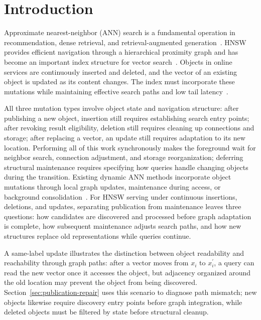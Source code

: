 \documentclass[sigconf,pbalance]{acmart}
\begin{document}

\maketitle



\section{Introduction}
\label{sec:introduction}

Approximate nearest-neighbor (ANN) search is a fundamental operation in recommendation, dense retrieval, and retrieval-augmented generation~\cite{covington2016youtube,karpukhin2020dpr,lewis2020rag}. HNSW provides efficient navigation through a hierarchical proximity graph and has become an important index structure for vector search~\cite{malkov2020hnsw,pan2024vdbsurvey}. Objects in online services are continuously inserted and deleted, and the vector of an existing object is updated as its content changes. The index must incorporate these mutations while maintaining effective search paths and low tail latency~\cite{mohoney2025quake,wang2026candor,dean2013tail}.

All three mutation types involve object state and navigation structure: after publishing a new object, insertion still requires establishing search entry points; after revoking result eligibility, deletion still requires cleaning up connections and storage; after replacing a vector, an update still requires adaptation to its new location. Performing all of this work synchronously makes the foreground wait for neighbor search, connection adjustment, and storage reorganization; deferring structural maintenance requires specifying how queries handle changing objects during the transition. Existing dynamic ANN methods incorporate object mutations through local graph updates, maintenance during access, or background consolidation~\cite{zhang2026cleanann,yu2025greator,singh2021freshdiskann}. For HNSW serving under continuous insertions, deletions, and updates, separating publication from maintenance leaves three questions: how candidates are discovered and processed before graph adaptation is complete, how subsequent maintenance adjusts search paths, and how new structures replace old representations while queries continue.

A same-label update illustrates the distinction between object readability and reachability through graph paths: after a vector moves from $x_i$ to $x^{\prime}_i$, a query can read the new vector once it accesses the object, but adjacency organized around the old location may prevent the object from being discovered. Section~\ref{sec:publication-repair} uses this scenario to diagnose path mismatch; new objects likewise require discovery entry points before graph integration, while deleted objects must be filtered by state before structural cleanup.
\end{document}
